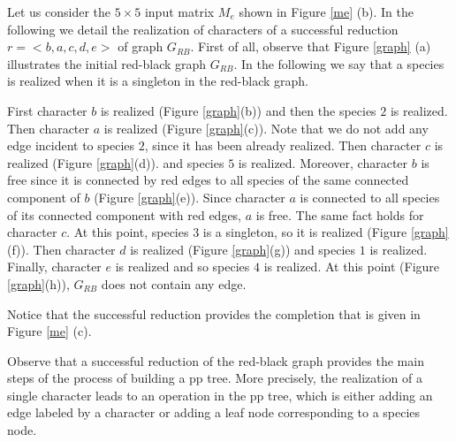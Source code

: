 \documentclass{llncs}
\newcommand{\grb}{$G_{RB}$ }
\newcommand{\grbd}{$G_{RB}$. }
\newcommand{\me}{{$M_e$} }
\begin{document}
\begin{example}
\label{example-reduce-graph}
Let us consider the $5 \times 5$ input matrix \me shown in Figure \ref{me} (b). In the following we detail the realization of characters of a successful reduction   $r = < b, a, c, d, e>$ of graph \grbd
First of all, observe that  Figure \ref{graph} (a) illustrates the initial red-black graph \grbd In the following we say that a species is realized when it is a singleton in the red-black graph.

First character $b$ is realized (Figure \ref{graph}(b)) and then  
the species $2$ is realized. Then character $a$ is realized (Figure \ref{graph}(c)). 
Note that we do not add any edge incident to species $2$, since it has been already realized. 
Then character $c$ is realized (Figure \ref{graph}(d)). 
and  species $5$ is realized. Moreover, character $b$ is free since it is connected by red edges to all species of the same connected component of $b$ (Figure \ref{graph}(e)).  Since character $a$ is connected to all species of its connected component with  red edges, $a$ is free.
The same fact holds for character $c$. At this point, species $3$ is a singleton, so it is realized (Figure \ref{graph}(f)).
Then character $d$ is realized (Figure \ref{graph}(g))  and species $1$ is realized. 
 Finally,   character $e$ is realized  and  so species $4$ is realized. At this point (Figure \ref{graph}(h)), \grb does not contain any edge.

Notice that the successful reduction provides the completion that is given in Figure \ref{me} (c).

\end{example}







Observe  that a successful reduction of the red-black graph provides the main steps of the process of building  a pp tree. More precisely,  the realization of a single character leads to an operation in the pp tree, which is either adding an edge labeled by a character or adding a leaf node corresponding to a species node.
\end{document}
